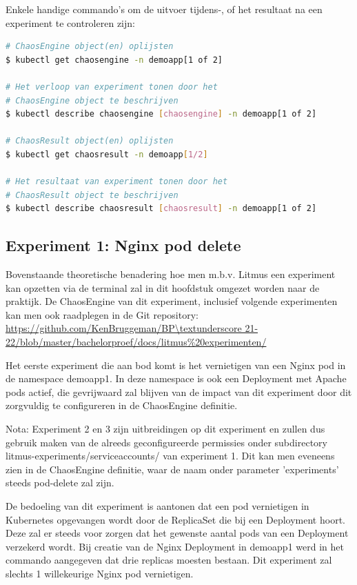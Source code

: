 Enkele handige commando's om de uitvoer tijdens-, of het resultaat na een experiment te controleren zijn:
\begin{lstlisting}[language=bash]
# ChaosEngine object(en) oplijsten
$ kubectl get chaosengine -n demoapp[1 of 2]

# Het verloop van experiment tonen door het 
# ChaosEngine object te beschrijven
$ kubectl describe chaosengine [chaosengine] -n demoapp[1 of 2]

# ChaosResult object(en) oplijsten
$ kubectl get chaosresult -n demoapp[1/2]

# Het resultaat van experiment tonen door het 
# ChaosResult object te beschrijven
$ kubectl describe chaosresult [chaosresult] -n demoapp[1 of 2]
\end{lstlisting}

\subsection{Experiment 1: Nginx pod delete}

Bovenstaande theoretische benadering hoe men m.b.v. Litmus een experiment kan opzetten via de terminal zal in dit hoofdstuk omgezet worden naar de praktijk. De ChaosEngine van dit experiment, inclusief volgende experimenten kan men ook raadplegen in de Git repository: \url{https://github.com/KenBruggeman/BP\textunderscore 21-22/blob/master/bachelorproef/docs/litmus%20experimenten/}

Het eerste experiment die aan bod komt is het vernietigen van een Nginx pod in de namespace demoapp1. In deze namespace is ook een Deployment met Apache pods actief, die gevrijwaard zal blijven van de impact van dit experiment door dit zorgvuldig te configureren in de ChaosEngine definitie. 

Nota: Experiment 2 en 3 zijn uitbreidingen op dit experiment en zullen dus gebruik maken van de alreeds geconfigureerde permissies onder subdirectory litmus-experiments/serviceaccounts/ van experiment 1. Dit kan men eveneens zien in de ChaosEngine definitie, waar de naam onder parameter 'experiments' steeds pod-delete zal zijn. 

De bedoeling van dit experiment is aantonen dat een pod vernietigen in Kubernetes opgevangen wordt door de ReplicaSet die bij een Deployment hoort. Deze zal er steeds voor zorgen dat het gewenste aantal pods van een Deployment verzekerd wordt. Bij creatie van de Nginx Deployment in demoapp1 werd in het commando aangegeven dat drie replicas moesten bestaan. Dit experiment zal slechts 1 willekeurige Nginx pod vernietigen.  


